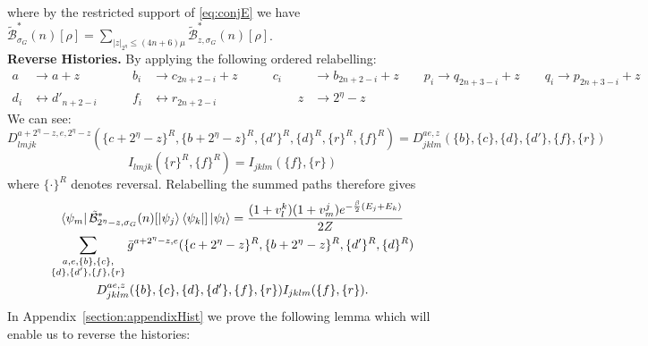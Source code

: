 \documentclass[aps,floatfix,10pt,amssymb,amsfont,amsmath,superscriptaddress,float,nofootinbib,longbibliography,nobalancelastpage,twocolumn]{revtex4-2}
\begin{document}
where by the restricted support of \eqref{eq:conjE} we have $\tilde{\mathcal{B}}^*_{\sigma_G}(n)[\rho] = \sum_{|z|_{2^{\eta}}\leq (4n+6)\mu} \tilde{\mathcal{B}}^*_{z,\sigma_G}(n)[\rho]$.\\
\textbf{Reverse Histories.} By applying the following ordered relabelling:
\begin{align}
    a &\rightarrow a+ z &\qquad b_i &\rightarrow c_{2n+2-i} + z\qquad& c_i &\rightarrow b_{2n+2-i} + z  \qquad p_i \rightarrow q_{2n+3-i}+z \qquad q_i \rightarrow p_{2n+3-i} +z\\   d_i &\leftrightarrow d'_{n+2-i} &\qquad f_i &\leftrightarrow r_{2n+2-i} &\qquad z &\rightarrow 2^{\eta} -z
\end{align}
We can see:
\begin{equation*}
   D^{a+2^{\eta}-z,e,2^\eta-z}_{lmjk}(\{c+2^{\eta}-z\}^R,\{b+2^{\eta}-z\}^R,\{d'\}^R,\{d\}^R,\{r\}^R,\{f\}^R) =  D^{ae,z}_{jklm}(\{b\},\{c\},\{d\},\{d'\},\{f\},\{r\})
\end{equation*}
\begin{equation*}
    I_{lmjk}(\{r\}^R,\{f\}^R) = I_{jklm}(\{f\},\{r\})
\end{equation*}
where $\{\cdot\}^R$ denotes reversal.
Relabelling the summed paths therefore gives
\begin{multline}
     \bra{\psi_m}\tilde{\mathcal{B}}^*_{2^{\eta}-z,\sigma_G}(n)[\ket{\psi_j}\bra{\psi_k}]\ket{\psi_l} = \frac{(1+v_l^k)(1+v_m^j)e^{-\frac{\beta}{2}(E_j+E_k)}}{2Z}\\\sum_{\substack{a,e,\{b\},\{c\},\\\{d\},\{d'\},\{f\},\{r\}}} \bar g^{a+2^{\eta} -z,e}(\{c+2^{\eta} -z\}^R,\{b+2^{\eta} -z\}^R,\{d'\}^R,\{d\}^R) 
     \\D^{ae,z}_{jklm}(\{b\},\{c\},\{d\},\{d'\},\{f\},\{r\})I_{jklm}(\{f\},\{r\}).
     \label{eq:relabelline}
\end{multline}
In Appendix~\ref{section:appendixHist} we prove the following lemma which will enable us to reverse the histories:
\end{document}
